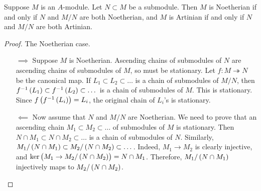 \begin{proposition}
\label{prop:11.4}
Suppose $ M $ is an $ A $-module. Let $ N \subset M $ be a submodule. Then $ M $ is Noetherian if and only if $ N $ and $ M / N $ are both Noetherian, and $ M $ is Artinian if and only if $ N $ and $ M / N $ are both Artinian.
\end{proposition}

\begin{proof}
The Noetherian case.
\begin{itemize}
\item[$ \implies $] Suppose $ M $ is Noetherian. Ascending chains of submodules of $ N $ are ascending chains of submodules of $ M $, so must be stationary. Let $ f : M \twoheadrightarrow N $ be the canonical map. If $ L_1 \subset L_2 \subset \dots $ is a chain of submodules of $ M / N $, then $ f^{-1}\br{L_1} \subset f^{-1}\br{L_2} \subset \dots $ is a chain of submodules of $ M $. This is stationary. Since $ f\br{f^{-1}\br{L_i}} = L_i $, the original chain of $ L_i $'s is stationary.


\item[$ \impliedby $] Now assume that $ N $ and $ M / N $ are Noetherian. We need to prove that an ascending chain $ M_1 \subset M_2 \subset \dots $ of submodules of $ M $ is stationary. Then $ N \cap M_1 \subset N \cap M_2 \subset \dots $ is a chain of submodules of $ N $. Similarly, $ M_1 / \br{N \cap M_1} \subset M_2 / \br{N \cap M_2} \subset \dots $. Indeed, $ M_1 \to M_2 $ is clearly injective, and $ \ker \br{M_1 \to M_2 / \br{N \cap M_2}} = N \cap M_1 $. Therefore, $ M_1 / \br{N \cap M_1} $ injectively maps to $ M_2 / \br{N \cap M_2} $.

\pagebreak


\end{itemize}
\end{proof}
